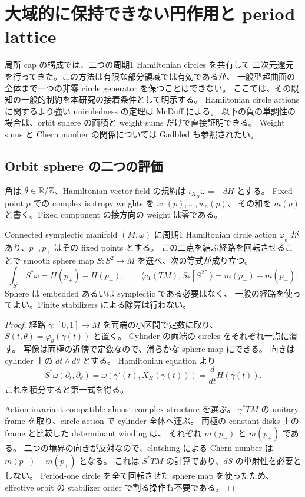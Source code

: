 \section{大域的に保持できない円作用と period lattice}
\label{gc:section}

局所 cap の構成では、二つの周期1 Hamiltonian circles を共有して
二次元還元を行ってきた。この方法は有限な部分領域では有効であるが、
一般型超曲面の全体まで一つの非零 circle generator を保つことはできない。
ここでは、その既知の一般的制約を本研究の接着条件として明示する。
Hamiltonian circle actions に関するより強い uniruledness の定理は
McDuff \cite[Corollary 1.2]{mcduff-uniruled-gc} による。
以下の負の単調性の場合は、orbit sphere の面積と weight sums だけで直接証明できる。
Weight sums と Chern number の関係については
Gadbled \cite[Appendix A.2]{gadbled-weights-gc} も参照されたい。

\subsection{Orbit sphere の二つの評価}

角は $\theta\in\mathbb R/\mathbb Z$、Hamiltonian vector field の規約は
$\iota_{X_H}\omega=-dH$ とする。
Fixed point $p$ での complex isotropy weights を $w_1(p),\ldots,w_n(p)$、
その和を $m(p)$ と書く。Fixed component の接方向の weight は零である。

\begin{lemma}\label{gc:orbit-sphere}
Connected symplectic manifold $(M,\omega)$ に周期1 Hamiltonian circle action
$\varphi_\theta$ があり、$p_-,p_+$ はその fixed points とする。
この二点を結ぶ経路を回転させることで smooth sphere map
$S:S^2\to M$ を選べ、次の等式が成り立つ。
\begin{equation}\label{gc:orbit-formula}
 \int_{S^2}S^*\omega=H(p_+)-H(p_-),\qquad
 \langle c_1(TM),S_*[S^2]\rangle=m(p_-)-m(p_+).
\end{equation}
Sphere は embedded あるいは symplectic である必要はなく、
一般の経路を使ってよい。Finite stabilizers による除算は行わない。
\end{lemma}

\begin{proof}
経路 $\gamma:[0,1]\to M$ を両端の小区間で定数に取り、
$S(t,\theta)=\varphi_\theta(\gamma(t))$ と置く。
Cylinder の両端の circles をそれぞれ一点に潰す。
写像は両極の近傍で定数なので、滑らかな sphere map にできる。
向きは cylinder 上の $dt\wedge d\theta$ とする。
Hamiltonian equation より
\[
 S^*\omega(\partial_t,\partial_\theta)
 =\omega(\gamma'(t),X_H(\gamma(t)))
 =\frac{d}{dt}H(\gamma(t)).
\]
これを積分すると第一式を得る。

Action-invariant compatible almost complex structure を選ぶ。
$\gamma^*TM$ の unitary frame を取り、circle action で cylinder 全体へ運ぶ。
両極の constant disks 上の frame と比較した determinant winding は、
それぞれ $m(p_-)$ と $m(p_+)$ である。
二つの境界の向きが反対なので、clutching による Chern number は
$m(p_-)-m(p_+)$ となる。
これは $S^*TM$ の計算であり、$dS$ の単射性を必要としない。
Period-one circle を全て回転させた sphere map を使ったため、
effective orbit の stabilizer order で割る操作も不要である。
\end{proof}

